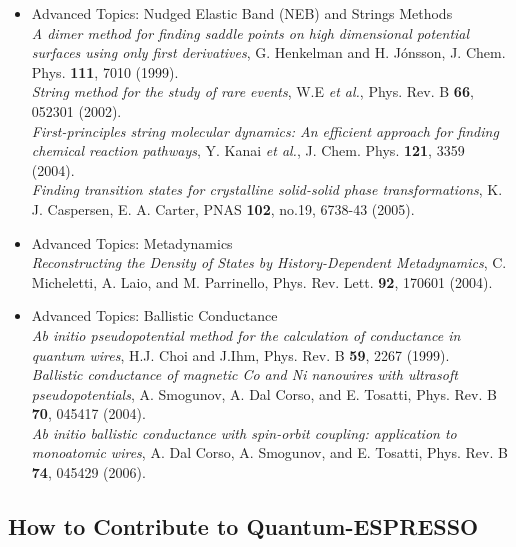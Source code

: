 \documentclass[12pt,a4paper]{article}
\begin{document}
\begin{itemize}
\item Advanced Topics: Nudged Elastic Band (NEB) and Strings Methods
\medskip \\
  \emph{A dimer method for finding saddle points on high dimensional 
    potential surfaces using only first derivatives}, G. Henkelman and 
    H. J{\'o}nsson, J. Chem. Phys. \textbf{111}, 7010 (1999).\\
  \emph{String method for the study of rare events}, W.E \emph{et al.},
  Phys. Rev. B \textbf{66}, 052301 (2002).\\
  \emph{First-principles string molecular dynamics: An efficient approach
    for finding chemical reaction pathways}, Y. Kanai \emph{et al.},
  J. Chem. Phys. \textbf{121}, 3359 (2004).\\
  {\em Finding transition states for crystalline solid-solid phase 
    transformations}, K. J. Caspersen, E. A. Carter, 
  PNAS \textbf{102}, no.19, 6738-43 (2005).
\item Advanced Topics: Metadynamics
\medskip \\
  \emph{Reconstructing the Density of States by History-Dependent 
  Metadynamics}, C. Micheletti, A. Laio, and M. Parrinello,
  Phys. Rev. Lett. \textbf{92}, 170601 (2004).
\item Advanced Topics: Ballistic Conductance
\medskip \\
   \emph{Ab initio pseudopotential method for the calculation of 
    conductance in quantum wires}, H.J. Choi and J.Ihm, 
    Phys. Rev. B \textbf{59}, 2267 (1999).\\
   \emph{Ballistic conductance of magnetic Co and Ni nanowires 
    with ultrasoft pseudopotentials}, A. Smogunov, A. Dal Corso, 
    and E. Tosatti, Phys. Rev. B \textbf{70}, 045417 (2004).\\
   \emph{Ab initio ballistic conductance with spin-orbit coupling:
    application to monoatomic wires}, A. Dal Corso, A. Smogunov,
    and E. Tosatti, Phys. Rev. B \textbf{74}, 045429 (2006).\\
\end{itemize}

%

\subsection{How to Contribute to Quantum-ESPRESSO}
\end{document}

